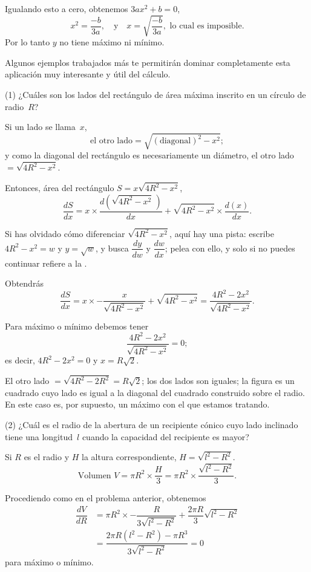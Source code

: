 \documentclass[12pt]{book}[2005/09/16]
\newcommand{\DPPageSep}[2]{\Pagelabel{#2}}
\newcommand{\Pagelabel}[1]
  {\phantomsection\label{#1}}
\newcommand{\Pageref}[2][p.]{%
  \ifthenelse{\not\equal{#1}{}}{%
    \hyperref[#2]{#1~\pageref{#2}}%
  }{%
    \hyperref[#2]{\pageref{#2}}%
  }%
}
\begin{document}
Igualando esto a cero, obtenemos $3ax^2 + b = 0$,
\[
x^2 = \frac{-b}{3a}, \quad\text{y}\quad x = \sqrt{\frac{-b}{3a}},\text{ lo cual es imposible.}
\]
Por lo tanto $y$ no tiene máximo ni mínimo.

Algunos ejemplos trabajados más te permitirán
dominar completamente esta aplicación muy interesante y útil
del cálculo.

(1) ¿Cuáles son los lados del rectángulo de área máxima
inscrito en un círculo de radio~$R$?

Si un lado se llama~$x$,
\[
\text{el otro lado} = \sqrt{(\text{diagonal})^2 - x^2};
\]
y como la diagonal del rectángulo es necesariamente un
diámetro, el otro lado~$ = \sqrt{4R^2 - x^2}$.

Entonces, área del rectángulo $S = x\sqrt{4R^2 - x^2}$,
\[
\frac{dS}{dx} = x × \dfrac{d\left(\sqrt{4R^2 - x^2}\,\right)}{dx} + \sqrt{4R^2 - x^2} × \dfrac{d(x)}{dx}.
\]

Si has olvidado cómo diferenciar $\sqrt{4R^2-x^2}$,
aquí hay una pista: escribe $4R^2-x^2=w$ y $y=\sqrt{w}$, y
busca $\dfrac{dy}{dw}$ y $\dfrac{dw}{dx}$; pelea con ello, y solo si no puedes
continuar refiere a la \Pageref[página]{dodge}.
\DPPageSep{117.png}{105}%

Obtendrás
\[
\dfrac{dS}{dx}
  = x × -\dfrac{x}{\sqrt{4R^2 - x^2}} + \sqrt{4R^2 - x^2}
  = \dfrac{4R^2 - 2x^2}{\sqrt{4R^2 - x^2}}.
\]

Para máximo o mínimo debemos tener
\[
\dfrac{4R^2 - 2x^2}{\sqrt{4R^2 - x^2}} = 0;
\]
es decir, $4R^2 - 2x^2 = 0$ y $x = R\sqrt{2}$.

El otro lado ${} = \sqrt{4R^2 - 2R^2} = R\sqrt{2}$; los dos lados
son iguales; la figura es un cuadrado cuyo lado es
igual a la diagonal del cuadrado construido sobre el
radio. En este caso es, por supuesto, un máximo con
el que estamos tratando.

(2) ¿Cuál es el radio de la abertura de un recipiente cónico
cuyo lado inclinado tiene una longitud~$l$ cuando
la capacidad del recipiente es mayor?

Si $R$ es el radio y $H$ la altura correspondiente,
$H = \sqrt{l^2 - R^2}$.
\[
\text{Volumen } V = \pi R^2 × \dfrac{H}{3} = \pi R^2 × \dfrac{\sqrt{l^2 - R^2}}{3}.
\]

Procediendo como en el problema anterior, obtenemos
\begin{align*}
\dfrac{dV}{dR}
  &= \pi R^2 × -\dfrac{R}{3\sqrt{l^2 - R^2}} + \dfrac{2\pi R}{3} \sqrt{l^2 - R^2} \\
  &= \dfrac{2\pi R(l^2 - R^2) - \pi R^3}{3\sqrt{l^2 - R^2}} = 0
\end{align*}
para máximo o mínimo.
\end{document}
